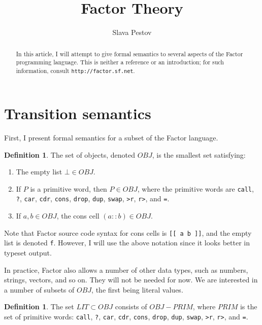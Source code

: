 \documentclass{amsart}
\theoremstyle{plain}
\theoremstyle{definition}
\newtheorem{definition}[theorem]{Definition}
\begin{document}
\title{Factor Theory}
\author{Slava Pestov}

\begin{abstract}

In this article, I will attempt to give formal semantics to several aspects of
the Factor programming language. This is neither a reference or an introduction; for such
information, consult \texttt{http://factor.sf.net}.

\end{abstract}

\maketitle

\tableofcontents{}

\section{Transition semantics}

First, I present formal semantics for a subset of the Factor language.

\begin{definition}
The set of objects, denoted $OBJ$, is the smallest set satisfying:

\begin{enumerate}

\item The empty list $\bot \in OBJ$.
\item If $P$ is a primitive word, then $P \in OBJ$, where the primitive words are
\texttt{call}, \texttt{?},
\texttt{car}, \texttt{cdr}, \texttt{cons},
\texttt{drop}, \texttt{dup}, \texttt{swap}, \texttt{>r}, \texttt{r>}, and
\texttt{=}.
\item If $a, b \in OBJ$, the cons cell $(a::b) \in OBJ$.
\end{enumerate}

Note that Factor source code syntax for cons cells is \texttt{[[ a b ]]}, and the
empty list is denoted \texttt{f}. However, I will use the above notation since it
looks better in typeset output.

\end{definition}

In practice, Factor also allows a number of other data types, such as
numbers, strings, vectors, and so on. They will not be needed for now. We are
interested in a number of subsets of $OBJ$, the first being literal values.

\begin{definition}
The set $LIT\subset OBJ$ consists of  $OBJ-PRIM$, where $PRIM$ is the set of primitive words:
\texttt{call}, \texttt{?},
\texttt{car}, \texttt{cdr}, \texttt{cons},
\texttt{drop}, \texttt{dup}, \texttt{swap}, \texttt{>r}, \texttt{r>}, and
\texttt{=}.
\end{definition}
\end{document}
